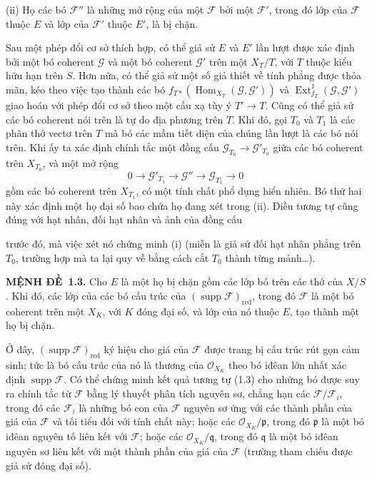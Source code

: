 \documentclass[11pt,twoside,openany]{book}
\numberwithin{equation}{section}
\newcommand{\src}[1]{%
  \phantomsection\hypertarget{src:\fgasourceid:#1}{}%
  \marginpar{\raggedleft\footnotesize\sffamily #1}%
}
\newcommand{\fgasourceid}{unset}
\newcommand{\result}[2]{\par\medskip\noindent\textbf{#1\if\relax\detokenize{#2}\relax\else\ #2\fi.}\quad}
\begin{document}
\smallskip
\noindent (ii) Họ các bó $\mathcal F''$ là những mở rộng của một $\mathcal F$
bởi một $\mathcal F'$, trong đó lớp của $\mathcal F$ thuộc $E$ và lớp của
$\mathcal F'$ thuộc $E'$, là bị chặn.

Sau một phép đổi cơ sở thích hợp, có thể giả sử $E$ và $E'$ lần lượt được xác
định bởi một bó coherent $\mathcal G$ và một bó coherent $\mathcal G'$ trên
một $X_T/T$, với $T$ thuộc kiểu hữu hạn trên $S$. Hơn nữa, có thể giả sử một
số giả thiết về tính phẳng được thỏa mãn, kéo theo việc tạo thành các bó
$f_{T*}(\operatorname{Hom}_{X_T}(\mathcal G,\mathcal G'))$ và
$\operatorname{Ext}^{1}_{f_T}(\mathcal G,\mathcal G')$ giao hoán với phép đổi
cơ sở theo một cấu xạ tùy ý $T'\longrightarrow T$. Cũng có thể giả sử các bó
coherent nói trên là tự do địa phương trên $T$. Khi đó, gọi $T_0$ và $T_1$
là các phân thớ vectơ trên $T$ mà bó các mầm tiết diện của chúng lần lượt là
các bó nói trên. Khi ấy ta xác định chính tắc một đồng cấu
$\mathcal G_{T_0}\longrightarrow\mathcal G'_{T_0}$ giữa các bó coherent trên
$X_{T_0}$, và một mở rộng
\[
0\longrightarrow\mathcal G'_{T_1}\longrightarrow\mathcal G''
\longrightarrow\mathcal G_{T_1}\longrightarrow0
\]
gồm các bó coherent trên $X_{T_1}$, có một tính chất phổ dụng hiển nhiên. Bó
thứ hai này xác định một họ đại số bao chứa họ đang xét trong (ii). Điều tương
tự cũng đúng với hạt nhân, đối hạt nhân và ảnh của đồng cấu
\src{253}
trước đó, mà việc xét nó chứng minh (i) (miễn là giả sử đối hạt nhân phẳng trên
$T_0$, trường hợp mà ta lại quy về bằng cách cắt $T_0$ thành từng
mảnh\ldots).

\result{MỆNH ĐỀ}{1.3} Cho $E$ là một họ bị chặn gồm các lớp bó trên các thớ
của $X/S$. Khi đó, các lớp của các bó cấu trúc của
$(\operatorname{supp}\mathcal F)_{\mathrm{red}}$, trong đó $\mathcal F$ là một
bó coherent trên một $X_K$, với $K$ đóng đại số, và lớp của nó thuộc $E$, tạo
thành một họ bị chặn.

Ở đây, $(\operatorname{supp}\mathcal F)_{\mathrm{red}}$ ký hiệu cho giá của
$\mathcal F$ được trang bị cấu trúc rút gọn cảm sinh; tức là bó cấu trúc của nó
là thương của $\mathcal O_{X_K}$ theo bó iđêan lớn nhất xác định
$\operatorname{supp}\mathcal F$. Có thể chứng minh kết quả tương tự (1.3) cho
những bó được suy ra chính tắc từ $\mathcal F$ bằng lý thuyết phân tích nguyên
sơ, chẳng hạn các $\mathcal F/\mathcal F_i$, trong đó các $\mathcal F_i$ là
những bó con của $\mathcal F$ nguyên sơ ứng với các thành phần của giá của
$\mathcal F$ và tối tiểu đối với tính chất này; hoặc các
$\mathcal O_{X_K}/\mathfrak p$, trong đó $\mathfrak p$ là một bó iđêan nguyên
tố liên kết với $\mathcal F$; hoặc các $\mathcal O_{X_K}/\mathfrak q$, trong đó
$\mathfrak q$ là một bó iđêan nguyên sơ liên kết với một thành phần của giá của
$\mathcal F$ (trường tham chiếu được giả sử đóng đại số).
\end{document}
